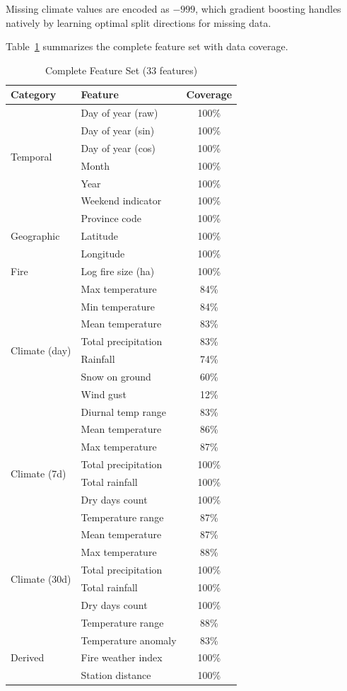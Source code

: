 \documentclass[sigconf,nonacm]{acmart}
\begin{document}
Missing climate values are encoded as $-999$, which gradient boosting handles natively by learning optimal split directions for missing data.

Table~\ref{tab:features} summarizes the complete feature set with data coverage.

\begin{table}[t]
\caption{Complete Feature Set (33 features)}
\label{tab:features}
\small
\centering
\begin{tabular}{llc}
\toprule
\textbf{Category} & \textbf{Feature} & \textbf{Coverage} \\
\midrule
\multirow{6}{*}{Temporal} & Day of year (raw) & 100\% \\
 & Day of year (sin) & 100\% \\
 & Day of year (cos) & 100\% \\
 & Month & 100\% \\
 & Year & 100\% \\
 & Weekend indicator & 100\% \\
\midrule
\multirow{3}{*}{Geographic} & Province code & 100\% \\
 & Latitude & 100\% \\
 & Longitude & 100\% \\
\midrule
Fire & Log fire size (ha) & 100\% \\
\midrule
\multirow{8}{*}{Climate (day)} & Max temperature & 84\% \\
 & Min temperature & 84\% \\
 & Mean temperature & 83\% \\
 & Total precipitation & 83\% \\
 & Rainfall & 74\% \\
 & Snow on ground & 60\% \\
 & Wind gust & 12\% \\
 & Diurnal temp range & 83\% \\
\midrule
\multirow{6}{*}{Climate (7d)} & Mean temperature & 86\% \\
 & Max temperature & 87\% \\
 & Total precipitation & 100\% \\
 & Total rainfall & 100\% \\
 & Dry days count & 100\% \\
 & Temperature range & 87\% \\
\midrule
\multirow{6}{*}{Climate (30d)} & Mean temperature & 87\% \\
 & Max temperature & 88\% \\
 & Total precipitation & 100\% \\
 & Total rainfall & 100\% \\
 & Dry days count & 100\% \\
 & Temperature range & 88\% \\
\midrule
\multirow{3}{*}{Derived} & Temperature anomaly & 83\% \\
 & Fire weather index & 100\% \\
 & Station distance & 100\% \\
\bottomrule
\end{tabular}
\end{table}
\end{document}
